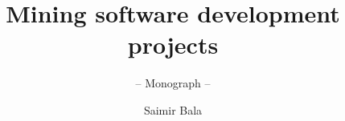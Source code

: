 \documentclass[graybox,envcountchap,a4paper]{svmono}
\begin{document}
\author{Saimir Bala}
\title{Mining software development projects}
\subtitle{-- Monograph --}

\frontmatter%



%
%


\tableofcontents

\listoffigures

\listoftables



\mainmatter%
%

%




















\nocite{*}




\backmatter%

%
\printindex

\end{document}
